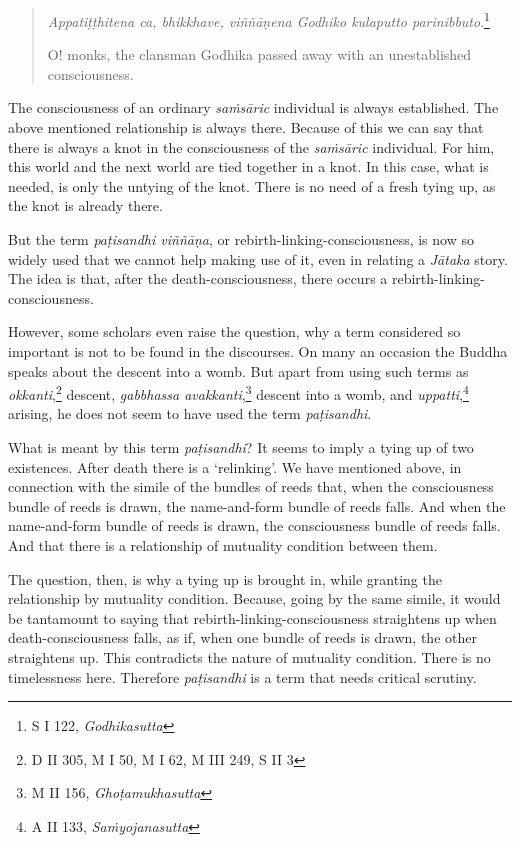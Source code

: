 \begin{quote}
\emph{Appatiṭṭhitena ca, bhikkhave, viññāṇena Godhiko kulaputto parinibbuto}.\footnote{S I 122, \emph{Godhikasutta}}

O! monks, the clansman Godhika passed away with an unestablished consciousness.
\end{quote}

The consciousness of an ordinary \emph{saṁsāric} individual is always established. The above mentioned relationship is always there. Because of this we can say that there is always a knot in the consciousness of the \emph{saṁsāric} individual. For him, this world and the next world are tied together in a knot. In this case, what is needed, is only the untying of the knot. There is no need of a fresh tying up, as the knot is already there.

But the term \emph{paṭisandhi viññāṇa}, or rebirth-linking-consciousness, is now so widely used that we cannot help making use of it, even in relating a \emph{Jātaka} story. The idea is that, after the death-consciousness, there occurs a rebirth-linking-consciousness.

However, some scholars even raise the question, why a term considered so important is not to be found in the discourses. On many an occasion the Buddha speaks about the descent into a womb. But apart from using such terms as \emph{okkanti},\footnote{D II 305, M I 50, M I 62, M III 249, S II 3} descent, \emph{gabbhassa avakkanti},\footnote{M II 156, \emph{Ghoṭamukhasutta}} descent into a womb, and \emph{uppatti},\footnote{A II 133, \emph{Saṁyojanasutta}} arising, he does not seem to have used the term \emph{paṭisandhi}.

What is meant by this term \emph{paṭisandhi}? It seems to imply a tying up of two existences. After death there is a `relinking'. We have mentioned above, in connection with the simile of the bundles of reeds that, when the consciousness bundle of reeds is drawn, the name-and-form bundle of reeds falls. And when the name-and-form bundle of reeds is drawn, the consciousness bundle of reeds falls. And that there is a relationship of mutuality condition between them.

The question, then, is why a tying up is brought in, while granting the relationship by mutuality condition. Because, going by the same simile, it would be tantamount to saying that rebirth-linking-consciousness straightens up when death-consciousness falls, as if, when one bundle of reeds is drawn, the other straightens up. This contradicts the nature of mutuality condition. There is no timelessness here. Therefore \emph{paṭisandhi} is a term that needs critical scrutiny.

